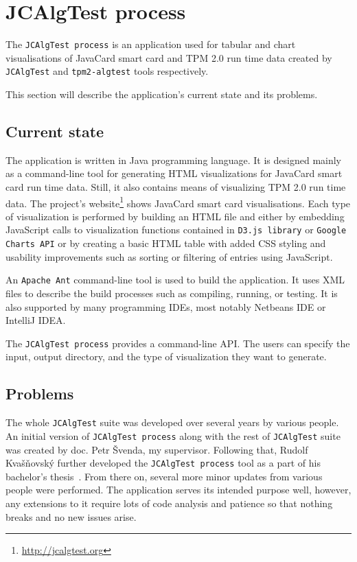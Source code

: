 \section{JCAlgTest process}
The \texttt{JCAlgTest process} is an application used for tabular and chart visualisations of JavaCard smart card and TPM 2.0 run time data created by \texttt{JCAlgTest} and \texttt{tpm2-algtest} tools respectively. 

This section will describe the application's current state and its problems.
\subsection{Current state}

The application is written in Java programming language. It is designed mainly as a command-line tool for generating HTML visualizations for JavaCard smart card run time data. Still, it also contains means of visualizing TPM 2.0 run time data. The project's website\footnote{\url{http://jcalgtest.org}} shows JavaCard smart card visualisations. Each type of visualization is performed by building an HTML file and either by embedding JavaScript calls to visualization functions contained in  \texttt{D3.js library} or \texttt{Google Charts API} or by creating a basic HTML table with added CSS styling and usability improvements such as sorting or filtering of entries using JavaScript. 

An \texttt{Apache Ant} command-line tool is used to build the application. It uses XML files to describe the build processes such as compiling, running, or testing. It is also supported by many programming IDEs, most notably Netbeans IDE or IntelliJ IDEA.

The \texttt{JCAlgTest process} provides a command-line API. The users can specify the input, output directory, and the type of visualization they want to generate.

\subsection{Problems}\label{subsec:design-problems}
The whole \texttt{JCAlgTest} suite was developed over several years by various people. An initial version of \texttt{JCAlgTest process} along with the rest of \texttt{JCAlgTest} suite was created by doc. Petr Švenda, my supervisor. Following that, Rudolf Kvašňovský further developed the \texttt{JCAlgTest process} tool as a part of his bachelor's thesis~\cite{Kvasnovsky2016thesis}. From there on, several more minor updates from various people were performed. The application serves its intended purpose well, however, any extensions to it require lots of code analysis and patience so that nothing breaks and no new issues arise.

